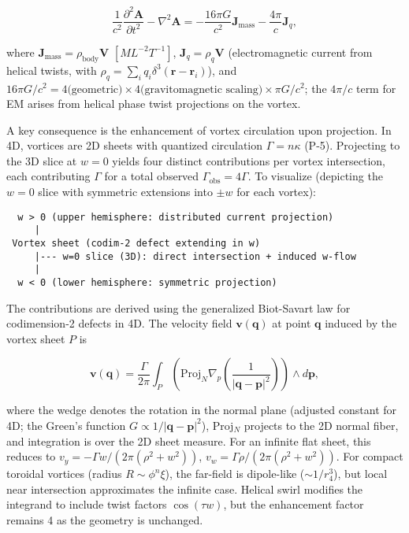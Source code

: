 \begin{equation}
\frac{1}{c^2} \frac{\partial^2 \mathbf{A}}{\partial t^2} - \nabla^2 \mathbf{A} = -\frac{16\pi G}{c^2} \mathbf{J}_{\text{mass}} - \frac{4\pi}{c} \mathbf{J}_q,
\end{equation}

where $\mathbf{J}_{\text{mass}} = \rho_{\text{body}} \mathbf{V}$ $[M L^{-2} T^{-1}]$, $\mathbf{J}_q = \rho_q \mathbf{V}$ (electromagnetic current from helical twists, with $\rho_q = \sum_i q_i \delta^3(\mathbf{r} - \mathbf{r}_i)$), and $16\pi G/c^2 = 4 \text{(geometric)} \times 4 \text{(gravitomagnetic scaling)} \times \pi G/c^2$; the $4\pi/c$ term for EM arises from helical phase twist projections on the vortex.

A key consequence is the enhancement of vortex circulation upon projection. In 4D, vortices are 2D sheets with quantized circulation $\Gamma = n \kappa$ (P-5). Projecting to the 3D slice at $w=0$ yields four distinct contributions per vortex intersection, each contributing $\Gamma$ for a total observed $\Gamma_{\text{obs}} = 4\Gamma$. To visualize (depicting the $w=0$ slice with symmetric extensions into $\pm w$ for each vortex):

\begin{verbatim}
  w > 0 (upper hemisphere: distributed current projection)
     |
 Vortex sheet (codim-2 defect extending in w)
     |--- w=0 slice (3D): direct intersection + induced w-flow
     |
  w < 0 (lower hemisphere: symmetric projection)
\end{verbatim}

The contributions are derived using the generalized Biot-Savart law for codimension-2 defects in 4D. The velocity field $\mathbf{v}(\mathbf{q})$ at point $\mathbf{q}$ induced by the vortex sheet $P$ is

\[
\mathbf{v}(\mathbf{q}) = \frac{\Gamma}{2\pi} \int_P \left( \text{Proj}_N \nabla_p \left( \frac{1}{|\mathbf{q} - \mathbf{p}|^2} \right) \right) \wedge d\mathbf{p},
\]

where the wedge denotes the rotation in the normal plane (adjusted constant for 4D; the Green's function $G \propto 1/|\mathbf{q}-\mathbf{p}|^2$), Proj$_N$ projects to the 2D normal fiber, and integration is over the 2D sheet measure. For an infinite flat sheet, this reduces to $v_y = -\Gamma w / (2\pi (\rho^2 + w^2))$, $v_w = \Gamma \rho / (2\pi (\rho^2 + w^2))$. For compact toroidal vortices (radius $R \sim \phi^n \xi$), the far-field is dipole-like ($\sim 1/r_4^3$), but local near intersection approximates the infinite case. Helical swirl modifies the integrand to include twist factors $\cos(\tau w)$, but the enhancement factor remains 4 as the geometry is unchanged.

